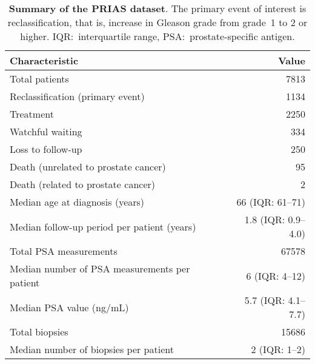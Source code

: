 \begin{table}
\small\sf\centering
\caption{\textbf{Summary of the PRIAS dataset}. The primary event of interest is reclassification, that is, increase in Gleason grade from grade~1 to 2 or higher. IQR:~interquartile range, PSA:~prostate-specific antigen.}
\label{table:prias_summary}
\begin{tabular}{lr}
\toprule
\textbf{Characteristic} & \textbf{Value}\\
\midrule
Total patients & 7813\\
Reclassification (primary event) & 1134\\
Treatment & 2250\\
Watchful waiting & 334\\
Loss to follow-up & 250\\
Death (unrelated to prostate cancer) & 95\\
Death (related to prostate cancer) & 2\\
\midrule
Median age at diagnosis (years) & 66 (IQR: 61--71)\\
Median follow-up period per patient (years) &  1.8 (IQR: 0.9--4.0)\\
Total PSA measurements & 67578\\
Median number of PSA measurements per patient &  6 (IQR: 4--12)\\
Median PSA value (ng/mL) & 5.7 (IQR: 4.1--7.7)\\
Total biopsies & 15686\\
Median number of biopsies per patient &  2 (IQR: 1--2)\\
\bottomrule
\end{tabular}
\end{table}